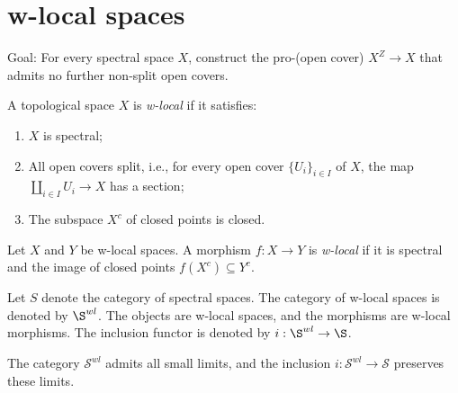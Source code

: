\section{w-local spaces}

Goal: For every spectral space \(X\), construct the pro-(open cover) \(X^Z \to X\) that admits no further non-split open covers.

\begin{definition}
    \label{def:w-local-space}
    A topological space \(X\) is \emph{w-local} if it satisfies:
    \begin{enumerate}
        \item \(X\) is spectral;
        \item All open covers split, i.e., for every open cover \(\{U_i\}_{i \in I}\) of \(X\), the map \(\coprod_{i \in I} U_i \to X\) has a section;
        \item The subspace \(X^c\) of closed points is closed.
    \end{enumerate}
\end{definition}

\begin{definition}
    Let \(X\) and \(Y\) be w-local spaces. A morphism \(f: X \to Y\) is \emph{w-local} if it is spectral and the image of closed points \(f(X^c) \subseteq Y^c\).
    \label{def:w-local-morphism}
\end{definition}

\begin{definition}
    \label{def:w-local-space-category}

    Let \(S\) denote the category of spectral spaces. The category of w-local spaces is denoted by \(\S^{wl}\). The objects are w-local spaces, and the morphisms are w-local morphisms. The inclusion functor is denoted by \(i: \S^{wl} \to \S\).
\end{definition}

\begin{lemma}
    \label{lem:w-local-space-preserves-limits}

    The category $\mathcal{S}^{wl}$ admits all small limits, and the inclusion $i : \mathcal{S}^{wl} \to \mathcal{S}$ preserves these limits.
\end{lemma}

